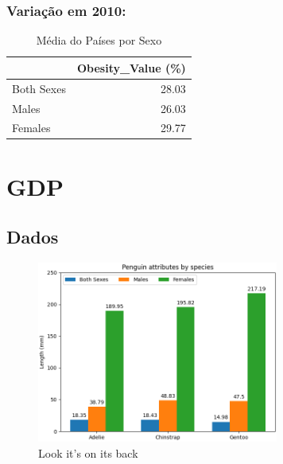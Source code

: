 \documentclass{article}%
\begin{document}
\subsubsection{Variação em 2010:}%
\label{ssubsec:Variaoem2010}%


\begin{table}[htbp]%
\centering%
\begin{tabular}{lr}
\toprule
 & Obesity\_Value (\%) \\
\midrule
Both Sexes & 28.03 \\
Males & 26.03 \\
Females & 29.77 \\
\bottomrule
\end{tabular}
%
\caption{Média do Países por Sexo}%
\end{table}

%
\newpage%
\section{GDP}%
\label{sec:GDP}%
\subsection{Dados}%
\label{subsec:Dados}%


\begin{figure}[htbp]%
\centering%
\includegraphics[width=300px]{img/foo.png}%
\caption{Look it's on its back}%
\end{figure}

%
\end{document}
